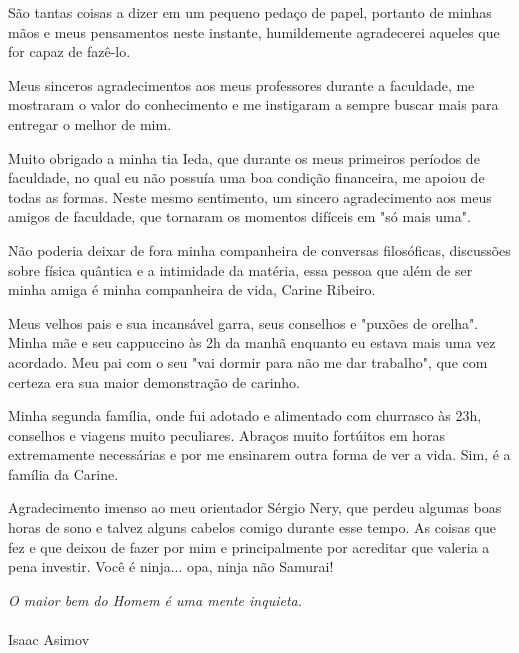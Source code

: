 \documentclass[
	12pt,				%
	openright,			%
	oneside,			%
	a4paper,			%
	english,			%
	french,				%
	spanish,			%
	brazil				%
	]{abntex2}
\begin{document}
\cleardoublepage
\begin{agradecimentos}
São tantas coisas a dizer em um pequeno pedaço de papel, portanto de minhas mãos e meus pensamentos neste instante, humildemente agradecerei aqueles que for capaz de fazê-lo.

 Meus sinceros agradecimentos aos meus professores durante a faculdade, me mostraram o valor do conhecimento e me instigaram a sempre buscar mais para entregar o melhor de mim.
 
 Muito obrigado a minha tia Ieda, que durante os meus primeiros períodos de faculdade, no qual eu não possuía uma boa condição financeira, me apoiou de todas as formas. Neste mesmo sentimento, um sincero agradecimento aos meus amigos de faculdade, que tornaram os momentos difíceis em "só mais uma".
 
 Não poderia deixar de fora minha companheira de conversas filosóficas, discussões sobre física quântica e a intimidade da matéria, essa pessoa que além de ser minha amiga é minha companheira de vida, Carine Ribeiro.
 
 Meus velhos pais e sua incansável garra, seus conselhos e "puxões de orelha". Minha mãe e seu cappuccino às 2h da manhã enquanto eu estava mais uma vez acordado. Meu pai com o seu "vai dormir para não me dar trabalho", que com certeza era sua maior demonstração de carinho.
 
 Minha segunda família, onde fui adotado e alimentado com churrasco às 23h, conselhos e viagens muito peculiares. Abraços muito fortúitos em horas extremamente necessárias e por me ensinarem outra forma de ver a vida. Sim, é a família da Carine.
 
Agradecimento imenso ao meu orientador Sérgio Nery, que perdeu algumas boas horas de sono e talvez alguns cabelos comigo durante esse tempo. As coisas que fez e que deixou de fazer por mim e principalmente por acreditar que valeria a pena investir. Você é ninja... opa, ninja não Samurai!


\end{agradecimentos}


\begin{epigrafe}
    \vspace*{\fill}
	\begin{flushright}
		\textit {O maior bem do Homem é uma mente inquieta. } \\ \\ Isaac Asimov
	\end{flushright}
\end{epigrafe}
\end{document}

